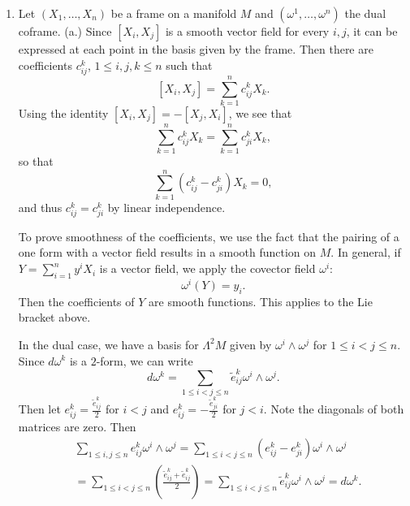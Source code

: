 \documentclass[11pt, reqno]{article}
\theoremstyle{plain}
\theoremstyle{definition}
\theoremstyle{remark}
\begin{document}
\begin{enumerate}
    Putting this all together,
    \begin{align*}
        d\omega(X_0, \dots, X_r) 
        & = (-1)^r X_r(\omega(X_0, \dots, X_{r-1})) + \sum_{i = 0}^{r-1}(-1)^{i + r}\omega([X_i, X_r], \dots, \hat{X_i}, \dots, X_{r-1}, \hat{X_r})\\
        & + \sum_{i = 0}^{r-1} (-1)^i X_i(\omega(X_0, \dots, \hat{X_i}, \dots, X_{r}))
         + \sum_{0 \leq i < j \leq r-1}(-1)^{i + j}\omega([X_i, X_j], \dots, \hat{X_i}, \dots, \hat{X_j}, \dots, X_{r})\\
         & = \sum_{i = 0}^r (-1)^i X_i(\omega(X_0, \dots, \hat{X_i}, \dots, X_r))
        + \sum_{0 \leq i < j \leq r} (-1)^{i + j}\omega([X_i, X_j], X_0, \dots, \hat{X_i}, \dots, \hat{X_j}, \dots, X_r).
    \end{align*}

    \item[4.] Let $(X_1, \dots, X_n)$ be a frame on a manifold $M$ and $(\omega^1, \dots, \omega^n)$ the dual coframe. 
    (a.) Since $[X_i, X_j]$ is a smooth vector field for every $i, j$, it can be expressed at each point in the basis 
    given by the frame. Then there are coefficients $c_{ij}^k$, $1 \leq i,j,k \leq n$ such that 
    \[
        [X_i, X_j] = \sum_{k = 1}^n c_{ij}^k X_k.
    \]
    Using the identity $[X_i, X_j] = -[X_j, X_i]$, we see that 
    \[
        \sum_{k = 1}^n c_{ij}^k X_k = \sum_{k = 1}^n c_{ji}^k X_k,
    \]
    so that
    \[
        \sum_{k = 1}^n (c_{ij}^k - c_{ji}^k) X_k = 0,
    \]
    and thus $c_{ij}^k = c_{ji}^k$ by linear independence. 

    To prove smoothness of the coefficients, we use the fact that the pairing of a one form with a vector field results in 
    a smooth function on $M$. In general, if $Y = \sum_{i = 1}^n y^i X_i$ is a vector field, we apply the covector field
    $\omega^i$:
    \[
        \omega^i(Y) = y_i.
    \]
    Then the coefficients of $Y$ are smooth functions. This applies to the Lie bracket above. 

    In the dual case, we have a basis for $\Lambda^2 M$ given by $\omega^i \wedge \omega^j$ for $1 \leq i < j \leq n$. Since
    $d\omega^k$ is a $2$-form, we can write
    \[
        d\omega^k = \sum_{1 \leq i < j \leq n} \tilde{e}_{ij}^k \omega^i \wedge \omega^j.
    \]
    Then let $e_{ij}^k = \frac{\tilde{e}_{ij}^k}{2}$ for $i < j$ and $e_{ij}^k = -\frac{\tilde{e}_{ji}^k}{2}$ for $j < i$. 
    Note the diagonals of both matrices are zero. Then 
    \begin{align*}
        & \sum_{1 \leq i, j \leq n} e_{ij}^k \omega^i \wedge \omega^j 
        = \sum_{1 \leq i < j \leq n}(e_{ij}^k - e_{ji}^k)\omega^i \wedge \omega^j\\
        & = \sum_{1 \leq i < j \leq n}\left(\frac{\tilde{e}_{ij}^k + \tilde{e}_{ij}^k}{2}\right)
        = \sum_{1 \leq i < j \leq n}\tilde{e}_{ij}^k \omega^i \wedge \omega^j = d\omega^k.
    \end{align*}


\end{enumerate}
\end{document}
